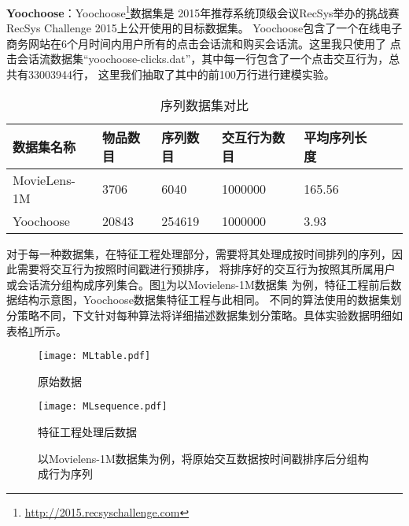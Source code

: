 \textbf{Yoochoose}：Yoochoose\footnote{\url{http://2015.recsyschallenge.com}}数据集是%
2015年推荐系统顶级会议RecSys举办的挑战赛RecSys Challenge 2015上公开使用的目标数据集。%
Yoochoose包含了一个在线电子商务网站在6个月时间内用户所有的点击会话流和购买会话流。这里我只使用了%
点击会话流数据集“yoochoose-clicks.dat”，其中每一行包含了一个点击交互行为，总共有33003944行，%
这里我们抽取了其中的前100万行进行建模实验。%
\begin{table}[]
  \centering
  \caption{序列数据集对比}
  \label{tab:datatable}
    \begin{tabular}{@{}lllllll@{}}
    \toprule
    数据集名称    & 物品数目 & 序列数目 & 交互行为数目 & 平均序列长度  \\ \midrule
    MovieLens-1M & 3706     & 6040 & 1000000 & 165.56 \\
    Yoochoose    & 20843 & 254619 & 1000000 & 3.93 \\ \bottomrule
    \end{tabular}
\end{table}
对于每一种数据集，在特征工程处理部分，需要将其处理成按时间排列的序列，因此需要将交互行为按照时间戳进行预排序，%
将排序好的交互行为按照其所属用户或会话流分组构成序列集合。图\ref{fig:feature_engine}为以Movielens-1M数据集%
为例，特征工程前后数据结构示意图，Yoochoose数据集特征工程与此相同。
不同的算法使用的数据集划分策略不同，下文针对每种算法将详细描述数据集划分策略。具体实验数据明细如表格\ref{tab:datatable}所示。
\begin{figure}[!htb]
   \begin{minipage}{0.48\textwidth}
     \centering
     \texttt{[image: MLtable.pdf]} %
     \caption{原始数据}
   \end{minipage}\hfill
   \begin {minipage}{0.48\textwidth}
     \centering
     \texttt{[image: MLsequence.pdf]} %
     \caption{特征工程处理后数据}
   \end{minipage}
   \caption{以Movielens-1M数据集为例，将原始交互数据按时间戳排序后分组构成行为序列}
   \label{fig:feature_engine}
\end{figure}


